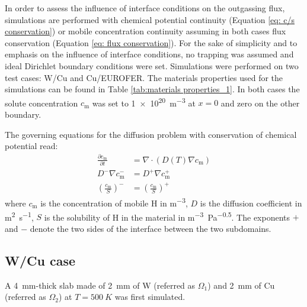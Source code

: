In order to assess the influence of interface conditions on the outgassing flux, simulations are performed with chemical potential continuity (Equation \ref{eq: c/s conservation}) or mobile concentration continuity assuming in both cases flux conservation (Equation \ref{eq: flux conservation}).
For the sake of simplicity and to emphasis on the influence of interface conditions, no trapping was assumed and ideal Dirichlet boundary conditions were set.
Simulations were performed on two test cases: W/Cu and Cu/EUROFER.
The materials properties used for the simulations can be found in Table \ref{tab:materials properties_1}.
In both cases the solute concentration $c_\mathrm{m}$ was set to \SI{1e20}{m^{-3}} at $x=0$ and zero on the other boundary.

The governing equations for the diffusion problem with conservation of chemical potential read:
\begin{subequations}
    \begin{align}
        \frac{\partial c_\mathrm{m}}{\partial t} &=\nabla \cdot\left(D(T) \nabla c_\mathrm{m}\right) \\
        D^- \nabla c_\mathrm{m}^- &= D^+ \nabla c_\mathrm{m}^+ \\
        \left(\frac{c_\mathrm{m}}{S}\right)^- &= \left(\frac{c_\mathrm{m}}{S}\right)^+
    \end{align}
\end{subequations}
where $c_\mathrm{m}$ is the concentration of mobile H in \si{m^{-3}}, $D$ is the diffusion coefficient in \si{m^2.s^{-1}}, $S$ is the solubility of H in the material in \si{m^{-3}.Pa^{-0.5}}.
The exponents $+$ and $-$ denote the two sides of the interface between the two subdomains.

\subsection{W/Cu case}
A \SI{4}{mm}-thick slab made of \SI{2}{mm} of W (referred as $\Omega_1$) and \SI{2}{mm} of Cu (referred as $\Omega_2$)  at $T=\SI{500}{K}$ was first simulated.



